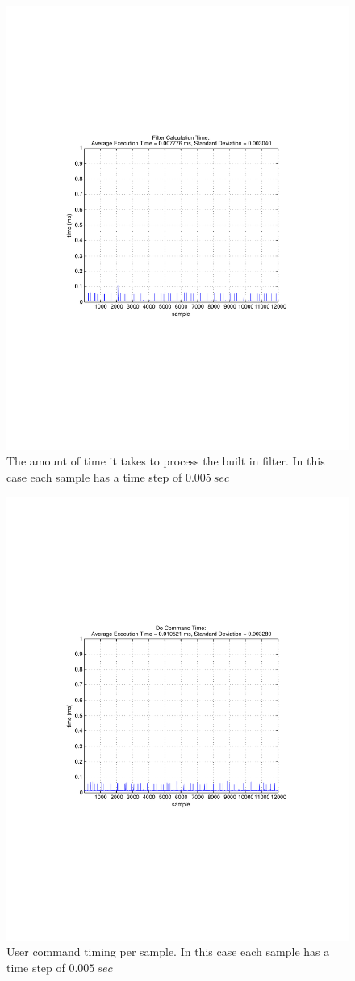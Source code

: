 \begin{figure}[thpb]
  \centering
\includegraphics[width=0.6\columnwidth]{./timingData/filter.pdf}
  \caption{The amount of time it takes to process the built in filter.  In this case each sample has a time step of $0.005~sec$}
  \label{fig:timing-filter}
\end{figure}




\begin{figure}[thpb]
  \centering
\includegraphics[width=0.6\columnwidth]{./timingData/doCmd.pdf}
  \caption{User command timing per sample.  In this case each sample has a time step of $0.005~sec$}
  \label{fig:timing-doCmd}
\end{figure}








